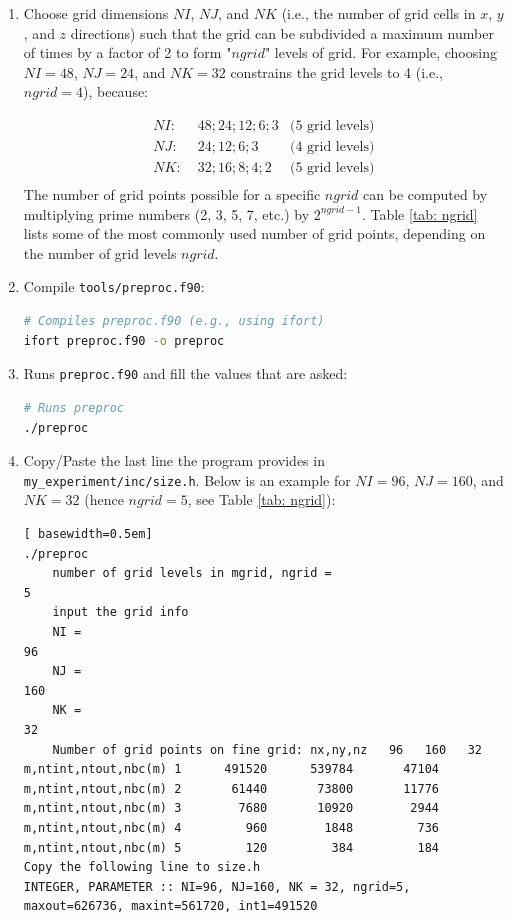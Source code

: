 \documentclass[12pt,letterpaper,titlepage]{article}
\begin{document}
\begin{enumerate}
	\item Choose grid dimensions $NI$, $NJ$, and $NK$ (i.e., the number of grid cells in $x$, $y$, and $z$ directions) such that the grid can be subdivided a maximum number of times by a factor of 2 to form "$ngrid$" levels of grid. For example, choosing $NI=48$, $NJ=24$, and $NK=32$ constrains the grid levels to 4 (i.e., $ngrid = 4$), because:

	\begin{align*} 
		NI:& \; 48; 24; 12; 6; 3 &\text{(5 grid levels)}\\
		NJ:& \; 24; 12; 6; 3 &\text{(4 grid levels)}\\
		NK:& \; 32; 16; 8; 4; 2 &\text{(5 grid levels)}\\
	\end{align*}
	The number of grid points possible for a specific $ngrid$ can be computed by multiplying prime numbers (2, 3, 5, 7, etc.) by $2^{ngrid-1}$. Table \ref{tab: ngrid} lists some of the most commonly used number of grid points, depending on the number of grid levels $ngrid$.

	\item Compile \texttt{tools/preproc.f90}:
\begin{lstlisting}[language=sh]
# Compiles preproc.f90 (e.g., using ifort)
ifort preproc.f90 -o preproc
\end{lstlisting}	
	
	\item Runs \texttt{preproc.f90} and fill the values that are asked:
\begin{lstlisting}[language=sh]
# Runs preproc
./preproc
\end{lstlisting}	

\item Copy/Paste the last line the program provides in \texttt{my\_experiment/inc/size.h}. Below is an example for $NI=96$, $NJ=160$, and $NK=32$ (hence $ngrid=5$, see Table \ref{tab: ngrid}):
\begin{lstlisting}[	basewidth=0.5em]
./preproc
	number of grid levels in mgrid, ngrid = 
5
	input the grid info
	NI = 
96
	NJ = 
160
	NK = 
32
	Number of grid points on fine grid: nx,ny,nz   96   160   32
m,ntint,ntout,nbc(m) 1      491520      539784       47104
m,ntint,ntout,nbc(m) 2       61440       73800       11776
m,ntint,ntout,nbc(m) 3        7680       10920        2944
m,ntint,ntout,nbc(m) 4         960        1848         736
m,ntint,ntout,nbc(m) 5         120         384         184	
Copy the following line to size.h
INTEGER, PARAMETER :: NI=96, NJ=160, NK = 32, ngrid=5, maxout=626736, maxint=561720, int1=491520
\end{lstlisting}	
\end{enumerate}
\end{document}
